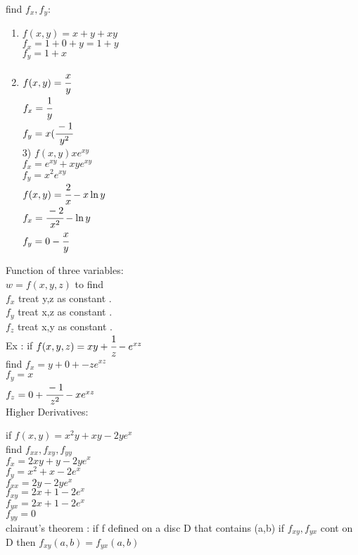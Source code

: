 \begin{example}
find $f_x , f_y$:
\begin{enumerate}
    \item $f(x,y) = x+y+xy $\\
$f_x = 1+0+y = 1+y $\\
$f_y = 1+x$
\item  $f(x,y) = \cfrac{x}{y}$\\
$f_x = \cfrac{1}{y}$\\
$f_y = x (\cfrac{-1}{y^{2}}$\\
3) $f(x,y) x e^{xy}$\\
$f_x = e^{xy} + xye^{xy}$\\
$f_y = x^{2}e^{xy}$\\
$f(x,y) = \cfrac{2}{x} -x\ln y$\\
$f_x = \cfrac{-2}{x^{2}} -\ln y$\\
$f_y = 0-\cfrac{x}{y}$
\end{enumerate}
\end{example}
\noindent{\color{smalt(darkpowderblue)}\rule{\linewidth}{.2mm}}
Function of three variables: \\
$w = f(x,y,z)$ to find \\
$f_x$ treat y,z as constant . \\
$f_y$ treat x,z as constant . \\
$f_z$ treat x,y as constant . \\
Ex : if $f(x,y,z) = xy +\cfrac{1}{z} - e^{xz}$\\
find $f_x = y+0+-z e^{xz}$\\
$f_y = x$\\
$f_z = 0+\cfrac{-1}{z^{2}} - xe^{xz}$\\
Higher Derivatives:

\noindent{\color{smalt(darkpowderblue)}\rule{\linewidth}{.2mm}}
\begin{example}
if $f(x,y) = x^{2} y + xy - 2ye^{x}$\\
find $f_{xx} , f_{xy} , f_{yy} $\\
$f_x = 2xy + y- 2ye^{x}$\\
$f_y = x^{2} + x- 2e^{x}$\\
$f_{xx} = 2y - 2ye^{x}$\\
$f_{xy} = 2x + 1 - 2e^{x}$\\
$f_{yx} = 2x+1-2e^{x} $\\
$f_{yy} = 0$\\
clairaut’s theorem : if f defined on a disc D that contains (a,b)
 if $f_{xy} , f_{yx} $ cont on D then $f_{xy}(a,b) = f_{yx}(a,b)$
\end{example}
\noindent{\color{smalt(darkpowderblue)}\rule{\linewidth}{.2mm}}

